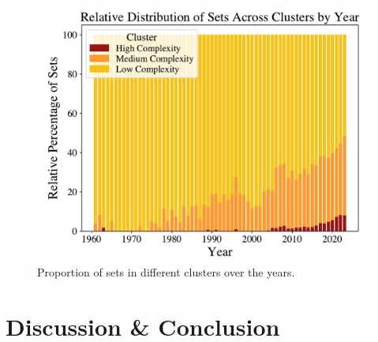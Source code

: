 \documentclass{article}
\theoremstyle{plain}
\theoremstyle{definition}
\theoremstyle{remark}
\begin{document}
\begin{figure}[H]
 \vskip 0.2in
 \begin{center}
 \centerline{\includegraphics[width=\columnwidth]{../Images/Clusters.pdf}}
\caption{Proportion of sets in different clusters over the years.}
\label{icml-historical}
 \end{center}
 \vskip -0.2in
\end{figure}

\section{Discussion \& Conclusion}\label{sec:conclusion}
\end{document}
